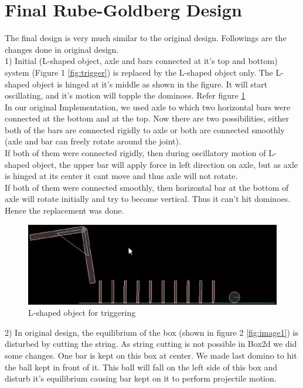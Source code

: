 \documentclass[a4paper,11pt]{article}
\begin{document}
\section{Final Rube-Goldberg Design}
{
\indent \indent The final design is very much similar to the original design. Followings are the changes done in original design. \\

1) Initial (L-shaped object, axle and bars connected at it's top and bottom) system (Figure 1 \ref{fig:trigger}) is replaced by the L-shaped object only. The L-shaped object is hinged at it's middle as shown in the figure. It will start oscillating, and it's motion will topple the dominoes. Refer figure \ref{fig:image4} \\
 In our original Implementation, we used axle to which two horizontal bars were connected at the bottom and at the top. Now there are two possibilities, either both of the bars are connected rigidly to axle or both are connected smoothly (axle and bar can freely rotate around the joint). \\
\indent If both of them were connected rigidly, then during oscillatory motion of L-shaped object, the upper bar will apply force in left direction on axle, but as axle is hinged at its center it cant move and thus axle will not rotate. \\
\indent If both of them were connected smoothly, then horizontal bar at the bottom of axle will rotate initially and try to become vertical. Thus it can't hit dominoes. Hence the replacement was done.

\begin{figure}[h]
    \centering
    \label{fig:image4}
    \includegraphics[scale=0.3]{images/image4}
    \caption{L-shaped object for triggering}
\end{figure}

2) In original design, the equilibrium of the box (shown in figure 2 \ref{fig:image1}) is disturbed by cutting the string. As string cutting is not possible in Box2d we did some changes. One bar is kept on this box at center. We made last domino to hit the ball kept in front of it. This ball will fall on the left side of this box and disturb it's equilibrium causing bar kept on it to perform projectile motion. 

}
\end{document}
